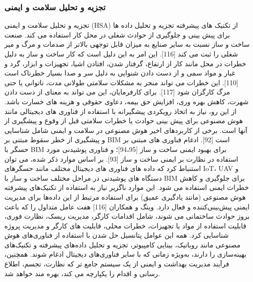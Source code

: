 \documentclass[towcolumn, 11pt]{Article}
\begin{document}
\begin{چکیده}
\subsubsection{تجزیه و تحلیل سلامت و ایمنی}
تجزیه و تحلیل سلامت و ایمنی (HSA) از تکنیک های پیشرفته تجزیه و تحلیل داده ها برای پیش بینی و جلوگیری از حوادث شغلی در محل کار استفاده می کند. صنعت ساخت و ساز نسبت به سایر صنایع به میزان قابل توجهی بالاتر از صدمات و مرگ و میر شغلی را ثبت می کند [116]. این امر به این دلیل است که کار ساخت و ساز به دلیل خطرات در محل مانند کار از ارتفاع، گرفتار شدن، افتادن اشیا، تجهیزات و ابزار، گرد و غبار و مواد سمی و از دست دادن شنوایی به دلیل سر و صدا بسیار خطرناک است [110]. این خطرات می تواند منجر به مشکلات سلامتی طولانی مدت، ناتوانی یا حتی مرگ کارگران شود [117]. برای کارفرمایان، این می تواند به معنای از دست دادن شهرت، کاهش بهره وری، افزایش حق بیمه، دعاوی حقوقی و هزینه های خسارت باشد. از این رو، نیاز به اتخاذ رویکردی پیشگیرانه با استفاده از فناوری های دیجیتالی مانند هوش مصنوعی برای پیش بینی حوادث یا خطرات سلامتی قبل از وقوع و پیشگیری از آنها است.
برخی از کاربردهای اخیر هوش مصنوعی در سلامت و ایمنی شامل شناسایی و پیشگیری از خطر سقوط مبتنی بر BIM است [92]. ادغام فناوری های مبتنی بر حسگر با BIM برای بهبود ایمنی ساخت و ساز [94،95]؛ و فناوری پوشیدنی مورد استفاده در نظارت بر ایمنی ساخت و ساز [93]. 
بر اساس موارد ذکر شده، می توان استنباط کرد که داده های فناوری های دیجیتال مختلف مانند حسگرهای IoT، UAV و دستگاه های پوشیدنی در مراحل مختلف ساخت و ساز با BIM برای جلوگیری و کاهش خطرات ایمنی استفاده می شود. این موارد ناگزیر نیاز به استفاده از تکنیک‌های پیشرفته هوش مصنوعی (مانند یادگیری عمیق) برای استفاده مرتبط از این داده‌ها برای مدیریت ایمنی پیش‌بینی‌کننده و فعال دارد. وینگ و همکاران [116] هفت عامل متداول را که باعث بروز حوادث ساختمانی می شوند، شامل اقدامات کارگر، مدیریت ریسک، نظارت فوری، قابلیت استفاده از مواد یا تجهیزات، خطرات محلی، قابلیت های کارگر و مدیریت پروژه شناسایی کرد. همه این عوامل پتانسیل حل شدن با استفاده از فناوری‌های هوش مصنوعی مانند روباتیک، بینایی کامپیوتر، تجزیه و تحلیل داده‌های پیشرفته و تکنیک‌های بهینه‌سازی را دارند، به‌ویژه زمانی که با سایر فناوری‌های دیجیتال ادغام شوند. همچنین، فرآیند مدیریت بهداشت و ایمنی از یک سیستم جامع تر که نظارت، تجسم، اطلاع رسانی و اقدام را یکپارچه می کند، بهره مند خواهد شد.


\end{چکیده}
\end{document}

